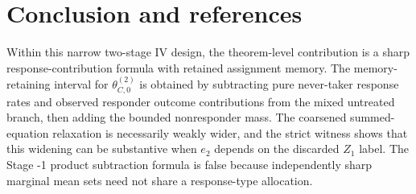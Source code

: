 \documentclass[11pt]{article}
\theoremstyle{definition}
\theoremstyle{plain}
\theoremstyle{remark}
\begin{document}
\section{Conclusion and references}
Within this narrow two-stage IV design, the theorem-level contribution is a sharp response-contribution formula with retained assignment memory.  The memory-retaining interval for
\(\theta_{C,0}^{(2)}\) is obtained by subtracting pure never-taker response rates and observed responder outcome contributions from the mixed untreated branch, then adding the bounded nonresponder mass.  The coarsened summed-equation relaxation is necessarily weakly wider, and the strict witness shows that this widening can be substantive when \(e_2\) depends on the discarded \(Z_1\) label.  The Stage -1 product subtraction formula is false because independently sharp marginal mean sets need not share a response-type allocation.
\end{document}
